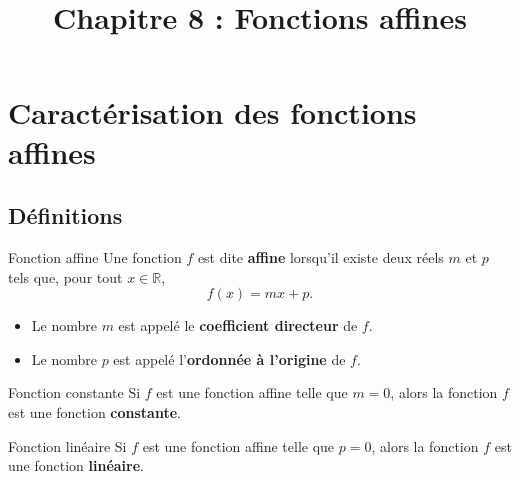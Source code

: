 \documentclass[11pt]{article}
\title{Chapitre 8 : Fonctions affines}
\date{}
\author{}
\begin{document}
\maketitle\thispagestyle{fancy}



\section{Caractérisation des fonctions affines}
\subsection{Définitions}

\begin{defi}{Fonction affine}
  Une fonction $f$ est dite \textbf{affine} lorsqu'il existe deux réels $m$ et
  $p$ tels que, pour tout $x\in\mathbb{R}$, $$f(x)=mx+p.$$
  \begin{itemize}
    \item Le nombre $m$ est appelé le \textbf{coefficient directeur} de $f$.
    \item Le nombre $p$ est appelé l'\textbf{ordonnée à l'origine} de $f$.
  \end{itemize}
\end{defi}

\begin{defi}{Fonction constante}
  Si $f$ est une fonction affine telle que $m=0$, alors la fonction $f$ est une
  fonction \textbf{constante}.
\end{defi}

\begin{defi}{Fonction linéaire}
  Si $f$ est une fonction affine telle que $p=0$, alors la fonction $f$ est une
  fonction \textbf{linéaire}.
\end{defi}
\end{document}
